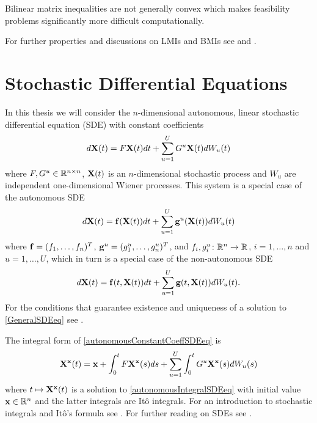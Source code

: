 \documentclass[a4paper,12pt,twoside,BCOR=10mm]{scrbook}
\begin{document}
\fi
Bilinear matrix inequalities are not generally convex which makes feasibility problems significantly more difficult computationally.

For further properties and discussions on LMIs and BMIs see \citep{vABr2000lmibmi} and \citep{KZM2018BMI1}.

\section{Stochastic Differential Equations}\label{SectionSDE}
In this thesis we will consider the $n$-dimensional autonomous, linear stochastic differential equation (SDE) with constant coefficients
\begin{align}\label{autonomousConstantCoeffSDEeq}
    d\mathbf{X}(t) = F\mathbf{X}(t)dt + \sum\limits_{u = 1}^UG^u \mathbf{X}(t)dW_u(t)
\end{align}
where $F,G^u \in \mathbb{R}^{n\times n}$, $\mathbf{X}(t)$ is an $n$-dimensional stochastic process and $W_u$ are independent one-dimensional Wiener processes.
This system is a special case of the autonomous SDE
\begin{align}\label{autonomousGeneralSDEeq}
    d\mathbf{X}(t) = \mathbf{f}(\mathbf{X}(t))dt + \sum_{u=1}^U \mathbf{g}^u(\mathbf{X}(t))dW_u(t)
\end{align}
where $\mathbf{f} = (f_1, \ldots, f_n)^T$, $\mathbf{g}^u = (g_1^u,\ldots,g_n^u)^T$, and $f_i, g_i^u\colon \mathbb{R}^{n} \to \mathbb{R}^{} $, $i = 1, \ldots, n$ and $u = 1,\ldots, U$, which in turn is a special case of the non-autonomous SDE
\begin{align}\label{GeneralSDEeq}
    d\mathbf{X}(t) = \mathbf{f}(t, \mathbf{X}(t))dt + \sum\limits_{u=1}^U\mathbf{g}(t, \mathbf{X}(t))dW_u(t).
\end{align}
For the conditions that guarantee existence and uniqueness of a solution to \eqref{GeneralSDEeq} see \citep{mao2007stochastic}.

The integral form of \eqref{autonomousConstantCoeffSDEeq} is
\begin{align}\label{autonomousIntegralSDEeq}
    \mathbf{X}^{\mathbf{x}}(t) = \mathbf{x} + \int_0^tF\mathbf{X}^{\mathbf{x}}(s)ds + \sum_{u = 1}^U \int_0^tG^u\mathbf{X}^{\mathbf{x}}(s)dW_u(s)
\end{align}
where $t \mapsto \mathbf{X}^{\mathbf{x}} (t)$ is a solution to \eqref{autonomousIntegralSDEeq} with initial value $\mathbf{x}\in\mathbb{R}^{n}$ and the latter integrals are Itô integrals. For an introduction to stochastic integrals and Itô's formula see \citep{brzezniak2000basic}. For further reading on SDEs see \citep{sdestab1974arnold, sdeoks2010, mao2007stochastic, sdestab2012khaminskii}.
\end{document}
